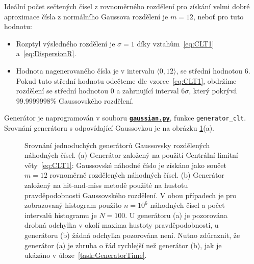 \documentclass[a4paper,11pt,twoside]{article}
\def\code#1{\textnormal{\texttt{#1}}}
\def\ghfile#1#2{\textnormal{\textbf{\texttt{\href{https://github.com/PavelStransky/PCInPhysics2021/blob/main/#1#2}{#2}}}}}
\theoremstyle{red}
\theoremstyle{green}
\begin{document}
    \begin{solution}
        Ideální počet sečtených čísel z rovnoměrného rozdělení pro získání velmi dobré aproximace čísla z normálního Gaussova rozdělení je $m=12$, neboť pro tuto hodnotu:
        \begin{itemize}
            \item Rozptyl výsledného rozdělení je $\sigma=1$ díky vztahům~\eqref{eq:CLT1} a~\eqref{eq:DispersionR}.
            \item Hodnota nagenerovaného čísla je v intervalu $\langle0,12\rangle$, se střední hodnotou $6$.
                Pokud tuto střední hodnotu odečteme dle vzorce~\eqref{eq:CLT1}, obdržíme rozdělení se střední hodnotou $0$ a zahrnující interval $6\sigma$, který pokrývá $99.9999998\%$ Gaussovského rozdělení.
        \end{itemize}
        Generátor je naprogramován v souboru \ghfile{python/histogram/}{gaussian.py}, funkce \code{generator_clt}.
        Srovnání generátoru s odpovídající Gaussovkou je na obrázku \ref{fig:GaussianGenerator}(a).

        \begin{figure}[!htb]
            \begin{subfigure}{0.49\linewidth}
                \centering{}
                \caption{}
            \end{subfigure}
            \begin{subfigure}{0.49\linewidth}
                \centering{}
                \caption{}
            \end{subfigure}
            \caption{
                \protect\small
                Srovnání jednoduchých generátorů Gaussovsky rozdělených náhodných čísel. 
                (a) Generátor založený na použití Centrální limitní věty~\eqref{eq:CLT1}: Gaussovské náhodné číslo je získáno jako součet $m=12$ rovnoměrně rozdělených náhodných čísel.
                (b) Generátor založený na hit-and-miss metodě použité na hustotu pravděpodobnosti Gaussovského rozdělení.
                V obou případech je pro zobrazovaný histogram použito  $n=10^{6}$ náhodných čísel a počet intervalů histogramu je $N=100$.
                U generátoru (a) je pozorována drobná odchylka v okolí maxima hustoty pravděpodobnosti, u generátoru (b) žádná odchylka pozorována není.
                Nutno zdůraznit, že generátor (a) je zhruba o řád rychlejší než generátor (b), jak je ukázáno v úloze~\ref{task:GeneratorTime}.
            }
            \label{fig:GaussianGenerator}
        \end{figure}    
    \end{solution}
    
\end{document}
